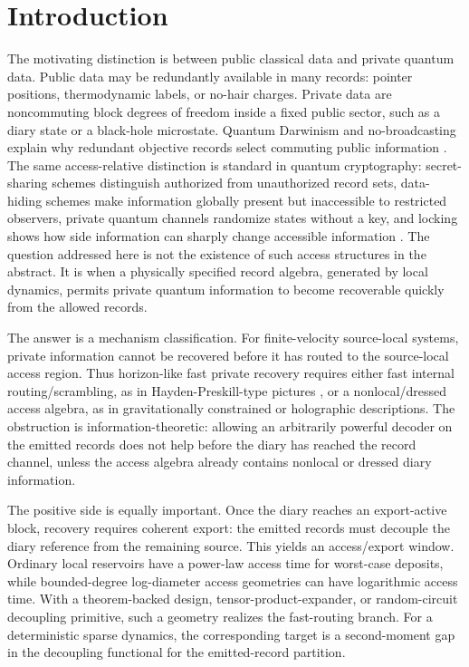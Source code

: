 \documentclass[11pt]{article}
\begin{document}
\section{Introduction}

The motivating distinction is between public classical data and private
quantum data.  Public data may be redundantly available in many records:
pointer positions, thermodynamic labels, or no-hair charges.  Private
data are noncommuting block degrees of freedom inside a fixed public
sector, such as a diary state or a black-hole microstate.  Quantum
Darwinism and no-broadcasting explain why redundant objective records
select commuting public information \citep{Barnum1996NoBroadcasting,
Brandao2015GenericClassical,Le2019StrongQD,Korbicz2020Roads}.  The
same access-relative distinction is standard in quantum cryptography:
secret-sharing schemes distinguish authorized from unauthorized record
sets, data-hiding schemes make information globally present but
inaccessible to restricted observers, private quantum channels randomize
states without a key, and locking shows how side information can sharply
change accessible information
\citep{CleveGottesmanLo1999,TerhalDiVincenzoLeung2001,
EggelingWerner2002,AmbainisMoscaTappDeWolf2000,
DiVincenzoHaydenTerhal2004}.  The question addressed here is not the
existence of such access structures in the abstract.  It is when a
physically specified record algebra, generated by local dynamics,
permits private quantum information to become recoverable quickly from
the allowed records.

The answer is a mechanism classification.  For finite-velocity
source-local systems, private information cannot be recovered before it
has routed to the source-local access region.  Thus horizon-like fast
private recovery requires either fast internal routing/scrambling, as in
Hayden-Preskill-type pictures \citep{Hayden2007BlackHoles}, or a
nonlocal/dressed access algebra, as in gravitationally constrained or
holographic descriptions.  The obstruction is information-theoretic:
allowing an arbitrarily powerful decoder on the emitted records does not
help before the diary has reached the record channel, unless the access
algebra already contains nonlocal or dressed diary information.

The positive side is equally important.  Once the diary reaches an
export-active block, recovery requires coherent export: the emitted
records must decouple the diary reference from the remaining source.
This yields an access/export window.  Ordinary local reservoirs have a
power-law access time for worst-case deposits, while bounded-degree
log-diameter access geometries can have logarithmic access time.  With a
theorem-backed design, tensor-product-expander, or random-circuit
decoupling primitive, such a geometry realizes the fast-routing branch.
For a deterministic sparse dynamics, the corresponding target is a
second-moment gap in the decoupling functional for the emitted-record
partition.
\end{document}
